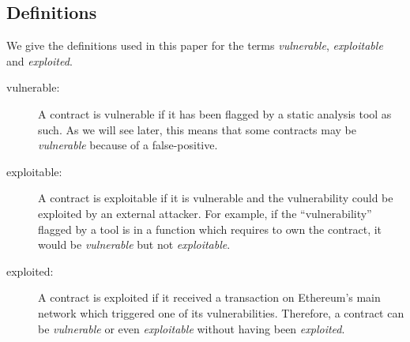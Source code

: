 \subsection{Definitions}
\label{ssec:definitions}
We give the definitions used in this paper for the terms \emph{vulnerable}, \emph{exploitable} and \emph{exploited}.
\begin{description}
\item[vulnerable:]
  A contract is vulnerable if it has been flagged by a static analysis tool as such.
  As we will see later, this means that some contracts may be \emph{vulnerable} because of a false-positive.
\item[exploitable:]
  A contract is exploitable if it is vulnerable and the vulnerability could be exploited by an external attacker.
  For example, if the ``vulnerability'' flagged by a tool is in a function which requires to own the contract, it would be \emph{vulnerable} but not \emph{exploitable}.
\item[exploited:]
  A contract is exploited if it received a transaction on Ethereum's main network which triggered one of its vulnerabilities.
  Therefore, a contract can be \emph{vulnerable} or even \emph{exploitable} without having been \emph{exploited}.
\end{description}


